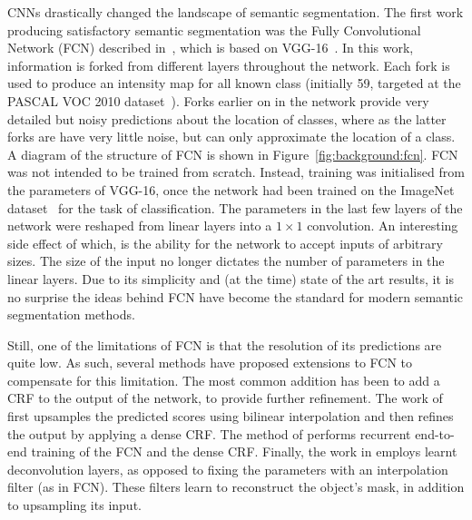 CNNs drastically changed the landscape of semantic segmentation. The
first work producing satisfactory semantic segmentation was the Fully
Convolutional Network (FCN) described in~\cite{long2015fully}, which
is based on VGG-16~\cite{simonyan2014vgg}. In this work, information
is forked from different layers throughout the network. Each fork is
used to produce an intensity map for all known class (initially 59,
targeted at the PASCAL VOC 2010
dataset~\cite{everingham2010pascal}). Forks earlier on in the network
provide very detailed but noisy predictions about the location of
classes, where as the latter forks are have very little noise, but can
only approximate the location of a class. A diagram of the structure
of FCN is shown in Figure~\ref{fig:background:fcn}. FCN was not
intended to be trained from scratch. Instead, training was initialised
from the parameters of VGG-16, once the network had been trained on
the ImageNet dataset~\cite{krizhevsky2012imagenet} for the task of
classification. The parameters in the last few layers of the network
were reshaped from linear layers into a $1\times 1$ convolution. An
interesting side effect of which, is the ability for the network to
accept inputs of arbitrary sizes. The size of the input no longer
dictates the number of parameters in the linear layers. Due to its
simplicity and (at the time) state of the art results, it is no
surprise the ideas behind FCN have become the standard for modern
semantic segmentation methods.

Still, one of the limitations of FCN is that the resolution of its
predictions are quite low. As such, several methods have proposed
extensions to FCN to compensate for this limitation. The most common
addition has been to add a CRF to the output of the network, to
provide further refinement. The work of \cite{chen2015semantic}
first upsamples the predicted scores using bilinear interpolation
and then refines the output by applying a dense CRF. The method of
\cite{zheng2015conditional} performs recurrent end-to-end training of
the FCN and the dense CRF. Finally, the work in \cite{noh2015learning}
employs learnt deconvolution layers, as opposed to fixing the
parameters with an interpolation filter (as in FCN). These filters
learn to reconstruct the object's mask, in addition to upsampling its
input.

